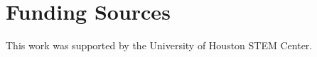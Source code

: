 \section{Funding Sources}
\label{funding}
This work was supported by the University of Houston STEM Center.
